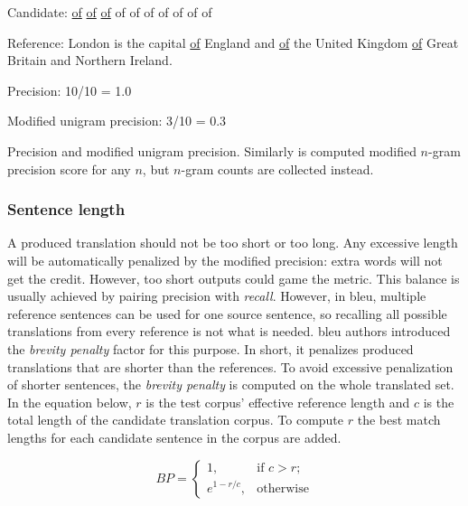 \vspace{\baselineskip}
\begin{minipage}{0.9\textwidth}

	Candidate: \underline{of} \underline{of} \underline{of} of of of of of of of

	Reference: London is the capital \underline{of} England and \underline{of} the United Kingdom
	\underline{of} Great Britain and Northern Ireland.

	Precision: 10/10 = 1.0

	Modified unigram precision: 3/10 = 0.3

	\begin{exmp}
	Precision and modified unigram precision.
	Similarly is computed modified $n$-gram precision score for any $n$,
	but $n$-gram counts are collected instead.
	\label{exmp:precision-modified-1gram-precision}
	\end{exmp}

\end{minipage}
\vspace{\baselineskip}

\subsubsection*{Sentence length}

A produced translation should not be too short or too long.
Any excessive length will be automatically penalized by the modified precision:
extra words will not get the credit.
However, too short outputs could game the metric.
This balance is usually achieved by pairing precision with \textit{recall}.
However, in \acrshort{bleu}, multiple reference sentences can be used
for one source sentence, so recalling all possible translations from
every reference is not what is needed.
\acrshort{bleu} authors introduced the \textit{brevity penalty} factor
for this purpose.
In short, it penalizes produced translations that are shorter than the references.
To avoid excessive penalization of shorter sentences,
the \textit{brevity penalty} is computed on the whole translated set.
In the equation below, $r$ is the test corpus’ effective reference length
and $c$ is the total length of the candidate translation corpus.
To compute $r$ the best match lengths for each candidate sentence
in the corpus are added.

\begin{equation}
\label{eq:brevity_penalty}
    BP=
    \begin{cases}
		1,           & \text{if } c > r;\\
		e^{1-r/c}, & \text{otherwise}
    \end{cases}
\end{equation}

